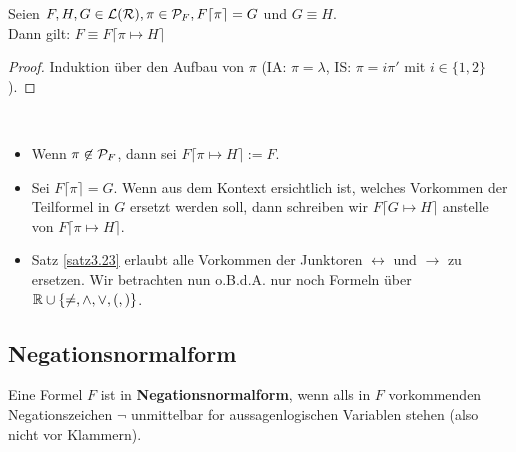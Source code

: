 \begin{satz}\label{satz3.23}
	Seien $F,H,G\in\L(\RR),\pi\in\P_F,F\lceil\pi\rceil=G$ und $G\equiv H$.\\
	Dann gilt: $F\equiv F\lceil\pi\mapsto H\rceil$
\end{satz}

\begin{proof}
	Induktion über den Aufbau von $\pi$ (IA: $\pi=\lambda$, IS: $\pi=i\pi'$ mit $i\in\lbrace1,2\rbrace$).
\end{proof}

\begin{konvention}\
	\begin{itemize}
		\item Wenn $\pi\not\in\P_F$, dann sei $F\lceil\pi\mapsto H\rceil:=F$.
		\item Sei $F\lceil\pi\rceil=G$. Wenn aus dem Kontext ersichtlich ist, welches Vorkommen der Teilformel in $G$ ersetzt werden soll, dann schreiben wir $F\lceil G\mapsto H\rceil$ anstelle von $F\lceil\pi\mapsto H\rceil$.
		\item Satz \ref{satz3.23} erlaubt alle Vorkommen der Junktoren $\leftrightarrow$ und $\to$ zu ersetzen. Wir betrachten nun o.B.d.A. nur noch Formeln über $\R\cup\lbrace\neq,\wedge,\vee,(,)\rbrace$.
	\end{itemize}
\end{konvention}

\subsection{Negationsnormalform}

\begin{definition}\label{def3.24}
	Eine Formel $F$ ist in \textbf{Negationsnormalform}, wenn alls in $F$ vorkommenden Negationszeichen $\neg$ unmittelbar for aussagenlogischen Variablen stehen (also nicht vor Klammern).
\end{definition}

